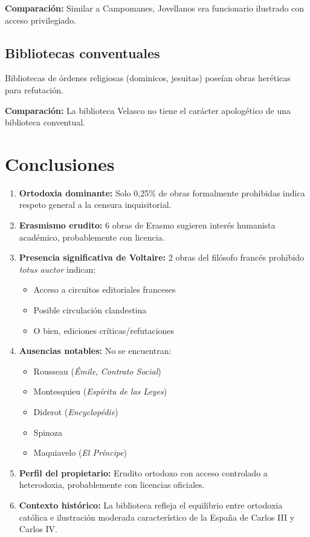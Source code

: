 \documentclass[12pt,a4paper]{article}
\begin{document}
\textbf{Comparación:} Similar a Campomanes, Jovellanos era funcionario ilustrado con acceso privilegiado.

\subsection{Bibliotecas conventuales}

Bibliotecas de órdenes religiosas (dominicos, jesuitas) poseían obras heréticas para refutación.

\textbf{Comparación:} La biblioteca Velasco no tiene el carácter apologético de una biblioteca conventual.

\section{Conclusiones}

\begin{enumerate}
    \item \textbf{Ortodoxia dominante:} Solo 0,25\% de obras formalmente prohibidas indica respeto general a la censura inquisitorial.

    \item \textbf{Erasmismo erudito:} 6 obras de Erasmo sugieren interés humanista académico, probablemente con licencia.

    \item \textbf{Presencia significativa de Voltaire:} 2 obras del filósofo francés prohibido \textit{totus auctor} indican:
    \begin{itemize}
        \item Acceso a circuitos editoriales franceses
        \item Posible circulación clandestina
        \item O bien, ediciones críticas/refutaciones
    \end{itemize}

    \item \textbf{Ausencias notables:} No se encuentran:
    \begin{itemize}
        \item Rousseau (\textit{Émile}, \textit{Contrato Social})
        \item Montesquieu (\textit{Espíritu de las Leyes})
        \item Diderot (\textit{Encyclopédie})
        \item Spinoza
        \item Maquiavelo (\textit{El Príncipe})
    \end{itemize}

    \item \textbf{Perfil del propietario:} Erudito ortodoxo con acceso controlado a heterodoxia, probablemente con licencias oficiales.

    \item \textbf{Contexto histórico:} La biblioteca refleja el equilibrio entre ortodoxia católica e ilustración moderada característico de la España de Carlos III y Carlos IV.
\end{enumerate}
\end{document}
